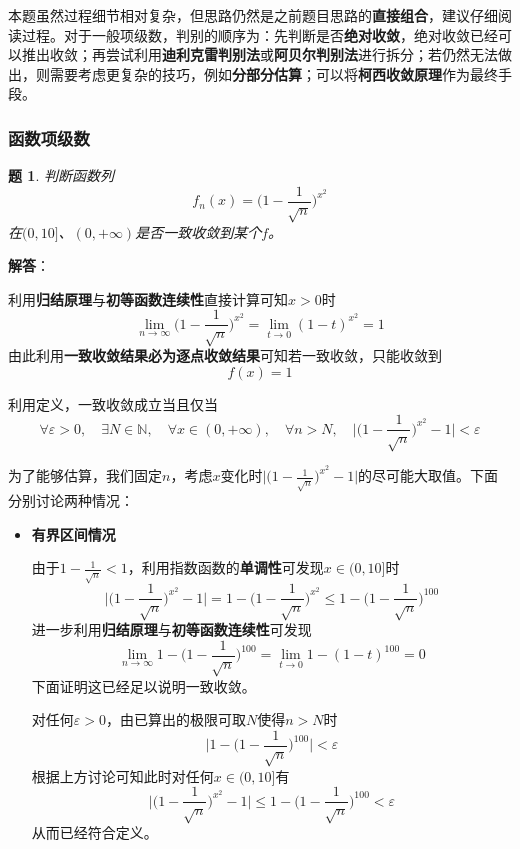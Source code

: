 \documentclass[a4paper,UTF8,fontset=windows,AutoFakeBold]{ctexart}
\newcommand*{\note}{\noindent *}
\theoremstyle{ex}
\newtheorem{exercise}{题}
\newcommand{\sol}[1]{{\vspace{5pt}\kaishu\noindent\textbf{解答}：\vspace{-3pt}
\begin{compactitem}
    \item[] #1
\end{compactitem}
}}
\begin{document}
\note 本题虽然过程细节相对复杂，但思路仍然是之前题目思路的\textbf{直接组合}，建议仔细阅读过程。对于一般项级数，判别的顺序为：先判断是否\textbf{绝对收敛}，绝对收敛已经可以推出收敛；再尝试利用\textbf{迪利克雷判别法}或\textbf{阿贝尔判别法}进行拆分；若仍然无法做出，则需要考虑更复杂的技巧，例如\textbf{分部分估算}；可以将\textbf{柯西收敛原理}作为最终手段。

\subsubsection{函数项级数}
\begin{framed}
\begin{exercise}\label{func uni}
    判断函数列
    $$f_n(x)=\bigg(1-\frac{1}{\sqrt{n}}\bigg)^{x^2}$$
    在$(0,10]$、$(0,+\infty)$是否一致收敛到某个$f$。
\end{exercise}
\sol{
    利用\textbf{归结原理}与\textbf{初等函数连续性}直接计算可知$x>0$时
    $$\lim_{n\to\infty}\bigg(1-\frac{1}{\sqrt{n}}\bigg)^{x^2}=\lim_{t\to0}(1-t)^{x^2}=1$$
    由此利用\textbf{一致收敛结果必为逐点收敛结果}可知若一致收敛，只能收敛到
    $$f(x)=1$$

    利用定义，一致收敛成立当且仅当
    $$\forall\varepsilon>0,\quad\exists N\in\mathbb{N},\quad\forall x\in(0,+\infty),\quad\forall n>N,\quad\bigg|\bigg(1-\frac{1}{\sqrt{n}}\bigg)^{x^2}-1\bigg|<\varepsilon$$

    为了能够估算，我们固定$n$，考虑$x$变化时$\big|\big(1-\frac{1}{\sqrt{n}}\big)^{x^2}-1\big|$的尽可能大取值。下面分别讨论两种情况：
    \begin{itemize}
        \item \textbf{有界区间情况}
        
        由于$1-\frac{1}{\sqrt{n}}<1$，利用指数函数的\textbf{单调性}可发现$x\in(0,10]$时
        $$\bigg|\bigg(1-\frac{1}{\sqrt{n}}\bigg)^{x^2}-1\bigg|=1-\bigg(1-\frac{1}{\sqrt{n}}\bigg)^{x^2}\le1-\bigg(1-\frac{1}{\sqrt{n}}\bigg)^{100}$$
        进一步利用\textbf{归结原理}与\textbf{初等函数连续性}可发现
        $$\lim_{n\to\infty}1-\bigg(1-\frac{1}{\sqrt{n}}\bigg)^{100}=\lim_{t\to0}1-(1-t)^{100}=0$$
        下面证明这已经足以说明一致收敛。

        对任何$\varepsilon>0$，由已算出的极限可取$N$使得$n>N$时
        $$\bigg|1-\bigg(1-\frac{1}{\sqrt{n}}\bigg)^{100}\bigg|<\varepsilon$$
        根据上方讨论可知此时对任何$x\in(0,10]$有
        $$\bigg|\bigg(1-\frac{1}{\sqrt{n}}\bigg)^{x^2}-1\bigg|\le1-\bigg(1-\frac{1}{\sqrt{n}}\bigg)^{100}<\varepsilon$$
        从而已经符合定义。


\end{itemize}}
\end{framed}
\end{document}

